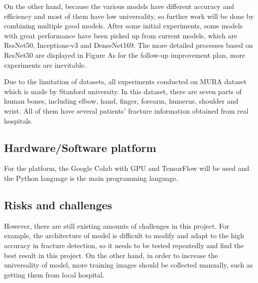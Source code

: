 \documentclass[12pt,oneside,a4paper]{article}
\begin{document}
On the other hand, because the various models have different accuracy and efficiency and most of them have low universality, so further work will be done by combining multiple good models. After some initial experiments, some models with great performance have been picked up from current models, which are ResNet50, Inceptions-v3 and DenseNet169. The more detailed processes based on ResNet50 are displayed in Figure As for the follow-up improvement plan, more experiments are inevitable. 

Due to the limitation of datasets, all experiments conducted on MURA dataset which is made by Stanford university. In this dataset, there are seven parts of human bones, including elbow, hand, finger, forearm, humerus, shoulder and wrist. All of them have several patients’ fracture information obtained from real hospitals. 


\subsection{Hardware/Software platform}
For the platform, the Google Colab with GPU and TensorFlow will be used and the Python language is the main programming language. 
\subsection{Risks and challenges}
However, there are still existing amounts of challenges in this project. For example, the architecture of model is difficult to modify and adapt to the high accuracy in fracture detection, so it needs to be tested repeatedly and find the best result in this project. On the other hand, in order to increase the universality of model, more training images should be collected manually, such as getting them from local hospital.
\end{document}
